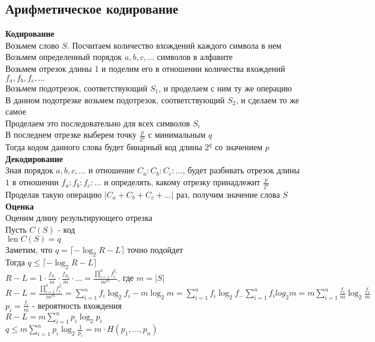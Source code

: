 \documentclass[12pt]{article}
\begin{document}
\subsection{Арифметическое кодирование}
\textbf{Кодирование}\\
Возьмем слово $S$. Посчитаем количество вхождений каждого символа в нем\\
Возьмем определенный порядок $a,b,c,\ldots$ символов в алфавите\\
Возьмем отрезок длины 1 и поделим его в отношении количества вхождений $f_a, f_b, f_c,\ldots$\\
Возьмем подотрезок, соответствующий $S_1$, и проделаем с ним ту же операцию\\
В данном подотрезке возьмем подотрезок, соответствующий $S_2$, и сделаем то же самое\\
Проделаем это последовательно для всех символов $S_i$\\
В последнем отрезке выберем точку $\frac{p}{2^q}$ с минимальным $q$\\
Тогда кодом данного слова будет бинарный код длины $2^q$ со значением $p$\\
\textbf{Декодирование}\\
Зная порядок $a,b,c,\ldots$ и отношение $C_a:C_b:C_c:\ldots$, будет разбивать отрезок длины $1$ в отношении $f_a:f_b:f_c:\ldots$ и определять, какому отрезку принадлежит $\frac{p}{2^q}$\\
Проделав такую операцию $|C_a+C_b+C_c+\ldots|$ раз, получим значение слова $S$\\
\textbf{Оценка}\\
Оценим длину результирующего отрезка\\
Пусть $C(S)$ - код\\
$\operatorname{len} C(S) = q$\\
Заметим, что $q = \lceil -\log_2 R-L \rceil$ точно подойдет\\
Тогда $q \leq \lceil -\log_2 R-L \rceil$\\
$R-L = 1\cdot\frac{f_{S_1}}{m}\cdot\frac{f_{S_2}}{m}\cdot\ldots = \frac{\prod_{i=1}^n f_i^{f_i}}{m^m}$, где $m = |S|$\\
$R-L = \frac{\prod_{i=1}^n f_i^{f_i}}{m^m} = \sum_{i=1}^n f_i\log_2 f_i - m\log_2 m = \sum_{i=1}^n f_i\log_2 f_ - \sum_{i=1}^n f_i log_2 m = m\sum_{i=1}^n \frac{f_i}{m}\log_2\frac{f_i}{m}$\\
$p_i = \frac{f_i}m$ - вероятность вхождения\\
$R-L = m\sum_{i=1}^n p_i\log_2 p_i$\\
$q \leq m\sum_{i=1}^n p_i\log_2 \frac1{p_i} = m\cdot H(p_1,\ldots,p_n)$
\end{document}
